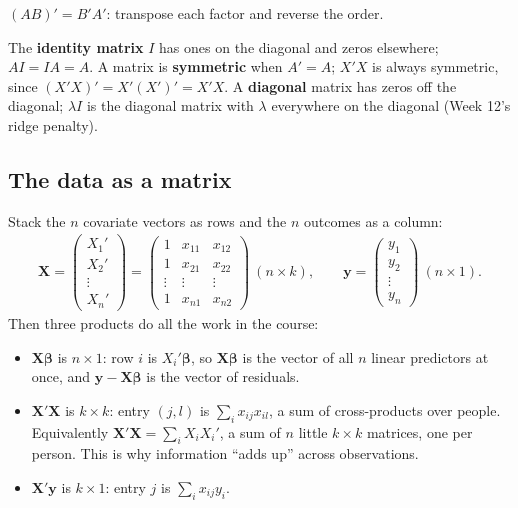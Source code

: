 \documentclass[11pt]{article}
\theoremstyle{definition}
\newcommand{\X}{\bm{X}}
\newcommand{\Y}{\bm{y}}
\newcommand{\bbeta}{\bm{\beta}}
\begin{document}
\begin{rulebox}
$(AB)' = B'A'$: transpose each factor and reverse the order.
\end{rulebox}

The \textbf{identity matrix} $I$ has ones on the diagonal and zeros
elsewhere; $AI = IA = A$. A matrix is \textbf{symmetric} when $A' = A$;
$X'X$ is always symmetric, since $(X'X)' = X'(X')' = X'X$. A
\textbf{diagonal} matrix has zeros off the diagonal; $\lambda I$ is the
diagonal matrix with $\lambda$ everywhere on the diagonal (Week 12's ridge
penalty).

\subsection{The data as a matrix}

Stack the $n$ covariate vectors as rows and the $n$ outcomes as a column:
\begin{align*}
  \X = \begin{pmatrix} X_1' \\ X_2' \\ \vdots \\ X_n' \end{pmatrix}
  = \begin{pmatrix}
      1 & x_{11} & x_{12} \\
      1 & x_{21} & x_{22} \\
      \vdots & \vdots & \vdots \\
      1 & x_{n1} & x_{n2}
    \end{pmatrix}
  \ (n \times k),
  \qquad
  \Y = \begin{pmatrix} y_1 \\ y_2 \\ \vdots \\ y_n \end{pmatrix}
  \ (n \times 1).
\end{align*}
Then three products do all the work in the course:
\begin{itemize}
  \item $\X\bbeta$ is $n \times 1$: row $i$ is $X_i'\bbeta$, so $\X\bbeta$
        is the vector of all $n$ linear predictors at once, and
        $\Y - \X\bbeta$ is the vector of residuals.
  \item $\X'\X$ is $k \times k$: entry $(j,l)$ is $\sum_i x_{ij}x_{il}$, a
        sum of cross-products over people. Equivalently $\X'\X = \sum_i
        X_iX_i'$, a sum of $n$ little $k \times k$ matrices, one per
        person. This is why information ``adds up'' across observations.
  \item $\X'\Y$ is $k \times 1$: entry $j$ is $\sum_i x_{ij}y_i$.
\end{itemize}
\end{document}
